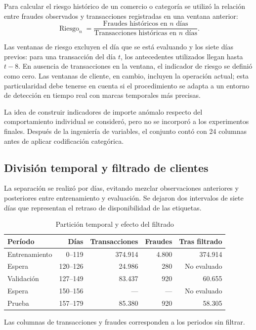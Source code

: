 Para calcular el riesgo histórico de un comercio o categoría se utilizó la relación entre fraudes observados y transacciones registradas en una ventana anterior:
\begin{equation}
\label{eq:riesgo}
\operatorname{Riesgo}_{n} = \frac{\text{Fraudes históricos en }n\text{ días}}{\text{Transacciones históricas en }n\text{ días}}.
\end{equation}

Las ventanas de riesgo excluyen el día que se está evaluando y los siete días previos: para una transacción del día $t$, los antecedentes utilizados llegan hasta $t-8$. En ausencia de transacciones en la ventana, el indicador de riesgo se definió como cero. Las ventanas de cliente, en cambio, incluyen la operación actual; esta particularidad debe tenerse en cuenta si el procedimiento se adapta a un entorno de detección en tiempo real con marcas temporales más precisas.

La idea de construir indicadores de importe anómalo respecto del comportamiento individual se consideró, pero no se incorporó a los experimentos finales. Después de la ingeniería de variables, el conjunto contó con 24 columnas antes de aplicar codificación categórica.

\subsection{División temporal y filtrado de clientes}
La separación se realizó por días, evitando mezclar observaciones anteriores y posteriores entre entrenamiento y evaluación. Se dejaron dos intervalos de siete días que representan el retraso de disponibilidad de las etiquetas.

\begin{table}[!htbp]
\centering
\small
\caption{Partición temporal y efecto del filtrado}
\label{tab:splits}
\begin{tabular}{@{}lrrrr@{}}
\toprule
\textbf{Período} & \textbf{Días} & \textbf{Transacciones} & \textbf{Fraudes} & \textbf{Tras filtrado} \\
\midrule
Entrenamiento & 0--119 & 374.914 & 4.800 & 374.914 \\
Espera & 120--126 & 24.986 & 280 & No evaluado \\
Validación & 127--149 & 83.437 & 920 & 60.655 \\
Espera & 150--156 & --- & --- & No evaluado \\
Prueba & 157--179 & 85.380 & 920 & 58.305 \\
\bottomrule
\end{tabular}
\par\smallskip
{\footnotesize Las columnas de transacciones y fraudes corresponden a los periodos sin filtrar.}
\end{table}

